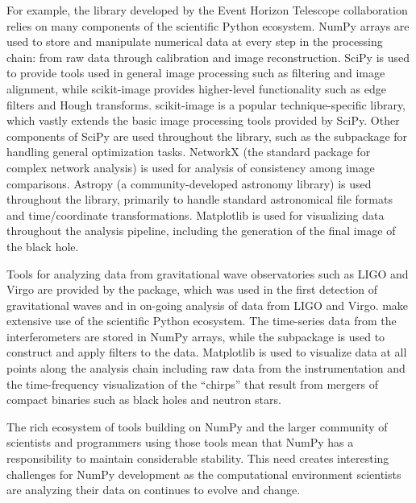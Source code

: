 For example, the  library developed by the Event Horizon Telescope 
collaboration relies on many components of the scientific Python ecosystem.
NumPy arrays are used to store and manipulate numerical data at every step
in the processing chain: from raw data through calibration and image 
reconstruction.
SciPy is used to provide tools used in general image processing such as 
filtering and image alignment, while scikit-image provides higher-level
functionality such as edge filters and Hough transforms.
scikit-image is a popular technique-specific library,
which vastly extends the basic image processing tools provided by SciPy.
Other components of SciPy are used throughout the library, such as the
 subpackage for handling general optimization tasks.
NetworkX \cite{SciPyProceedings_11} (the standard package for complex
network analysis) is used for analysis of consistency among image
comparisons.
Astropy \cite{astropy:2013, astropy:2018} (a community-developed astronomy
library) is used throughout the library,
primarily to handle standard astronomical file formats and time/coordinate
transformations.
Matplotlib is
used for visualizing data throughout the analysis pipeline,
including the generation of the final image of the black hole.

Tools for analyzing data from gravitational wave observatories such as LIGO
and Virgo are provided by the  package, which was used in the first
detection of gravitational waves \cite{abbott2016observation} and in 
on-going analysis of data from LIGO and Virgo.
 make extensive use of the scientific Python ecosystem.
The time-series data from the interferometers are stored in NumPy arrays,
while the  subpackage is used to construct and apply filters to the
data.
Matplotlib is used to visualize data at all points along the analysis chain
including raw data from the instrumentation and the time-frequency 
visualization of the ``chirps'' that result from mergers of compact binaries
such as black holes\cite{abbott2016observation} and
neutron stars\cite{abbott2017multi}.

The rich ecosystem of tools building on NumPy and the larger community
of scientists and programmers using those tools mean that NumPy has a
responsibility to maintain considerable stability.
This need creates interesting challenges for NumPy development as the
computational environment scientists are analyzing their data on continues
to evolve and change.

